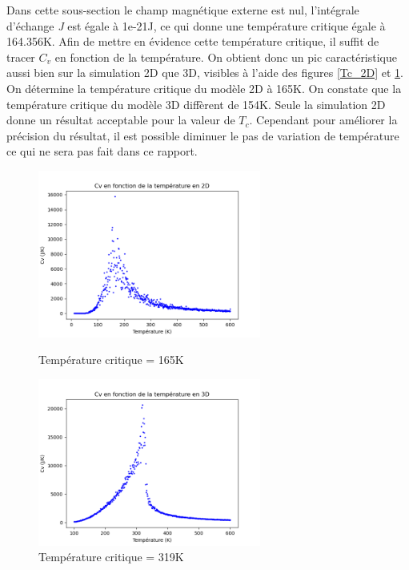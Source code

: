 \documentclass{article}
\begin{document}
Dans cette sous-section le champ magnétique externe est nul, l'intégrale d'échange \emph{J} est égale à 1e-21J, ce qui donne une température critique égale à 164.356K. Afin de mettre en évidence cette température critique, il suffit de tracer $C_{v}$ en fonction de la température. On obtient donc un pic caractéristique aussi bien sur la simulation 2D que 3D, visibles à l'aide des figures \ref{Tc_2D} et \ref{Tc_3D}. On détermine la température critique du modèle 2D à 165K. On constate que la température critique du modèle 3D diffèrent de 154K. Seule la simulation 2D donne un résultat acceptable pour la valeur de $T_{c}$. Cependant pour améliorer la précision du résultat, il est possible diminuer le pas de variation de température ce qui ne sera pas fait dans ce rapport. 


\begin{figure}[ht]
  \centering
  \begin{minipage}[b]{0.45\textwidth}
    \includegraphics[height=5.5cm]{Tc/Tc en 2D.png}
    \caption{Température critique = 165K}
    \label{Tc_2D}
  \end{minipage}
  \hspace{0.5cm}
  \begin{minipage}[b]{0.45\textwidth}
    \includegraphics[height=5.5cm]{Tc/Tc_en_3D.png}
    \caption{Température critique = 319K}
    \label{Tc_3D}
  \end{minipage}
\end{figure}
\end{document}
